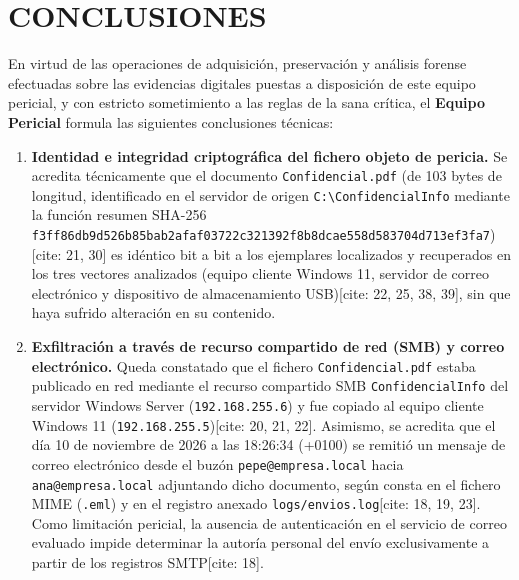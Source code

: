 \section{CONCLUSIONES}

En virtud de las operaciones de adquisición, preservación y análisis forense efectuadas sobre las evidencias digitales puestas a disposición de este equipo pericial, y con estricto sometimiento a las reglas de la sana crítica, el \textbf{Equipo Pericial \GrupoPracticas} formula las siguientes conclusiones técnicas:

\begin{enumerate}[leftmargin=1.6em, itemsep=0.7em]
	\item \textbf{Identidad e integridad criptográfica del fichero objeto de pericia.}
	Se acredita técnicamente que el documento \texttt{Confidencial.pdf} (de 103 bytes de longitud, identificado en el servidor de origen \texttt{C:\textbackslash ConfidencialInfo} mediante la función resumen SHA-256 \texttt{f3ff86db9d526b85bab2afaf03722c321392f8b8dcae558d583704d713ef3fa7})[cite: 21, 30] es idéntico bit a bit a los ejemplares localizados y recuperados en los tres vectores analizados (equipo cliente Windows 11, servidor de correo electrónico y dispositivo de almacenamiento USB)[cite: 22, 25, 38, 39], sin que haya sufrido alteración en su contenido.
	
	\item \textbf{Exfiltración a través de recurso compartido de red (SMB) y correo electrónico.}
	Queda constatado que el fichero \texttt{Confidencial.pdf} estaba publicado en red mediante el recurso compartido SMB \texttt{ConfidencialInfo} del servidor Windows Server (\texttt{192.168.255.6}) y fue copiado al equipo cliente Windows 11 (\texttt{192.168.255.5})[cite: 20, 21, 22]. Asimismo, se acredita que el día 10 de noviembre de 2026 a las 18:26:34 (+0100) se remitió un mensaje de correo electrónico desde el buzón \texttt{pepe@empresa.local} hacia \texttt{ana@empresa.local} adjuntando dicho documento, según consta en el fichero MIME (\texttt{.eml}) y en el registro anexado \texttt{logs/envios.log}[cite: 18, 19, 23]. Como limitación pericial, la ausencia de autenticación en el servicio de correo evaluado impide determinar la autoría personal del envío exclusivamente a partir de los registros SMTP[cite: 18].
	

\end{enumerate}
